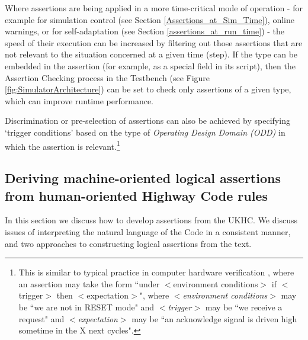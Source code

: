 Where assertions are being applied in a more time-critical mode of operation - for example for simulation control (see Section \ref{Assertions_at_Sim_Time}), online warnings, or for self-adaptation (see Section \ref{assertions_at_run_time}) - the speed of their execution can be increased by filtering out those assertions that are not relevant to the situation concerned at a given time (step). If the type can be embedded in the assertion (for example, as a special field in its script), then the Assertion Checking process in the Testbench (see Figure \ref{fig:SimulatorArchitecture}) can be set to check only assertions of a given type, which can improve runtime performance.

Discrimination or pre-selection of assertions can also be achieved by specifying `trigger conditions' based on the type of \textit{Operating Design Domain (ODD)} in which the assertion is relevant.\footnote{This is similar to typical practice in computer hardware verification \cite{tao2009}, where an assertion may take the form ``under $<$environment conditions$>$ if $<$trigger$>$ then $<$expectation$>$", where \textit{$<$environment conditions$>$} may be ``we are not in RESET mode" and \textit{$<$trigger$>$} may be ``we receive a request" and \textit{$<$expectation$>$}  may be ``an acknowledge signal is driven high sometime in the X next cycles".} 


\subsection{Deriving machine-oriented logical assertions from human-oriented Highway Code rules}
In this section we discuss how to develop assertions from the UKHC. We discuss issues of interpreting the natural language of the Code in a consistent manner, and two approaches to constructing logical assertions from the text. 

